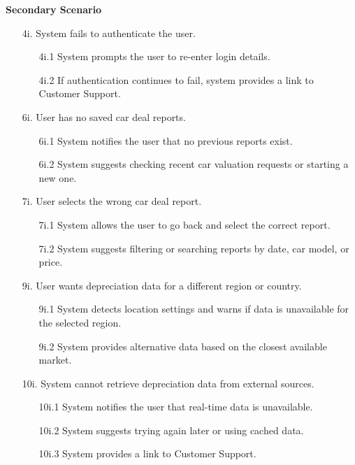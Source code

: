 \documentclass[]{article}
\begin{document}
\begin{enumerate}[{\bf {BE}1.}]
	\textbf{Secondary Scenario}

	\begin{enumerate}
		\item[4i.] System fails to authenticate the user.
		\begin{enumerate}
			\item[4i.1] System prompts the user to re-enter login details.
			\item[4i.2] If authentication continues to fail, system provides a link to Customer Support.
		\end{enumerate}

		\item[6i.] User has no saved car deal reports.
		\begin{enumerate}
			\item[6i.1] System notifies the user that no previous reports exist.
			\item[6i.2] System suggests checking recent car valuation requests or starting a new one.
		\end{enumerate}

		\item[7i.] User selects the wrong car deal report.
		\begin{enumerate}
			\item[7i.1] System allows the user to go back and select the correct report.
			\item[7i.2] System suggests filtering or searching reports by date, car model, or price.
		\end{enumerate}

		\item[9i.] User wants depreciation data for a different region or country.
		\begin{enumerate}
			\item[9i.1] System detects location settings and warns if data is unavailable for the selected region.
			\item[9i.2] System provides alternative data based on the closest available market.
		\end{enumerate}

		\item[10i.] System cannot retrieve depreciation data from external sources.
		\begin{enumerate}
			\item[10i.1] System notifies the user that real-time data is unavailable.
			\item[10i.2] System suggests trying again later or using cached data.
			\item[10i.3] System provides a link to Customer Support.
		\end{enumerate}
	\end{enumerate}


\end{enumerate}
\end{document}

